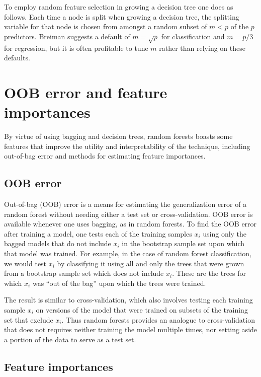 \documentclass[10pt,a4paper]{article}
\begin{document}
To employ random feature selection in growing a decision tree one does as follows. Each time a node is split when growing a decision tree, the splitting variable for that node is chosen from amongst a random subset of $m<p$ of the $p$ predictors. Breiman suggests a default of $m=\sqrt{p}$ for classification and $m=p/3$ for regression, but it is often profitable to tune $m$ rather than relying on these defaults. 

\section{OOB error and feature importances}\label{benefits}

By virtue of using bagging and decision trees, random forests boasts some features that improve the utility and interpretability of the technique, including out-of-bag error and methods for estimating feature importances.

\subsection{OOB error}

Out-of-bag (OOB) error is a means for estimating the generalization error of a random forest without needing either a test set or cross-validation. OOB error is available whenever one uses bagging, as in random forests. To find the OOB error after training a model, one tests each of the training samples $x_i$ using only the bagged models that do not include $x_i$ in the bootstrap sample set upon which that model was trained. For example, in the case of random forest classification, we would test $x_i$ by classifying it using all and only the trees that were grown from a bootstrap sample set which does not include $x_i$. These are the trees for which $x_i$ was ``out of the bag'' upon which the trees were trained.

The result is similar to cross-validation, which also involves testing each training sample $x_i$ on versions of the model that were trained on subsets of the training set that exclude $x_i$. Thus random forests provides an analogue to cross-validation that does not requires neither training the model multiple times, nor setting aside a portion of the data to serve as a test set.

\subsection{Feature importances}\label{feature_importances}
\end{document}
